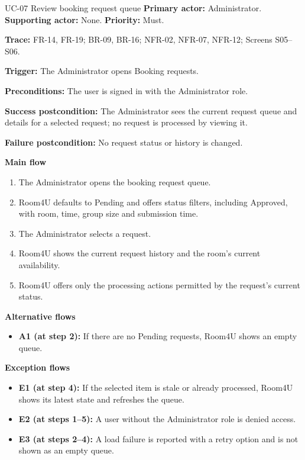 \begin{usecasebox}{UC-07 Review booking request queue}
\noindent\textbf{Primary actor:} Administrator.\quad
\textbf{Supporting actor:} None.\quad
\textbf{Priority:} Must.\par
\textbf{Trace:} FR-14, FR-19; BR-09, BR-16; NFR-02, NFR-07, NFR-12; Screens S05--S06.\par
\textbf{Trigger:} The Administrator opens Booking requests.\par
\textbf{Preconditions:} The user is signed in with the Administrator role.\par
\textbf{Success postcondition:} The Administrator sees the current request queue and details for a selected request; no request is processed by viewing it.\par
\textbf{Failure postcondition:} No request status or history is changed.\par
\textbf{Main flow}
\begin{enumerate}[label=\arabic*.,leftmargin=2em,itemsep=1pt,topsep=2pt]
  \item The Administrator opens the booking request queue.
  \item Room4U defaults to Pending and offers status filters, including Approved, with room, time, group size and submission time.
  \item The Administrator selects a request.
  \item Room4U shows the current request history and the room's current availability.
  \item Room4U offers only the processing actions permitted by the request's current status.
\end{enumerate}
\textbf{Alternative flows}
\begin{itemize}[label={},leftmargin=0pt,itemsep=1pt,topsep=1pt]
  \item \textbf{A1 (at step 2):} If there are no Pending requests, Room4U shows an empty queue.
\end{itemize}
\textbf{Exception flows}
\begin{itemize}[label={},leftmargin=0pt,itemsep=1pt,topsep=1pt]
  \item \textbf{E1 (at step 4):} If the selected item is stale or already processed, Room4U shows its latest state and refreshes the queue.
  \item \textbf{E2 (at steps 1--5):} A user without the Administrator role is denied access.
  \item \textbf{E3 (at steps 2--4):} A load failure is reported with a retry option and is not shown as an empty queue.
\end{itemize}
\end{usecasebox}

